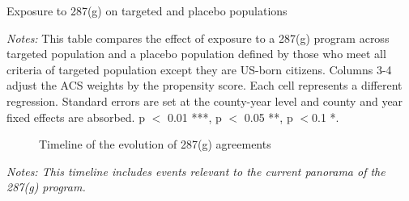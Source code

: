 \documentclass{article}
\begin{document}
\newpage
\begin{table}[h]
\centering
\caption{Exposure to 287(g)  on targeted and placebo populations}
\label{tab:regtp}
\end{table}

\justifying
\begin{spacing}{1}
\begin{footnotesize}
\noindent \textit{Notes:} This table compares the effect of exposure to a 287(g) program across targeted population and a placebo population defined by those who meet all criteria of targeted population except they are US-born citizens. Columns 3-4 adjust the ACS weights by the propensity score. Each cell represents a different regression. Standard errors are set at the county-year level and county and year fixed effects are absorbed. p $<$ 0.01 ***, p $<$ 0.05 **, p $<$0.1 *. 

\end{footnotesize}
\end{spacing}



\newpage
\begin{landscape}
    
\begin{figure}[h]
\centering
\caption{Timeline of the evolution of 287(g) agreements}
\label{tab:regtp}
\end{figure}

\justifying
\begin{spacing}{1}
\begin{footnotesize}
\noindent \textit{Notes: This timeline includes events relevant to the current panorama of the 287(g) program.}

\end{footnotesize}
\end{spacing}

\end{landscape}
\end{document}
